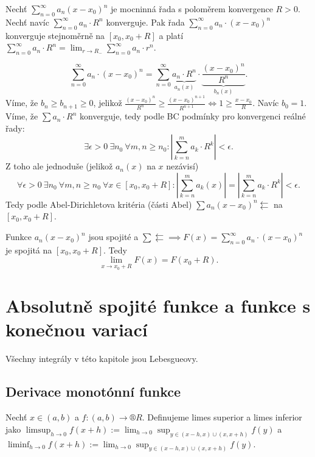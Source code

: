 \documentclass[12pt]{article}					%
\begin{document}
	\begin{veta}[Abelova]
		Nechť $\sum_{n=0}^∞ a_n (x - x_0)^n$ je mocninná řada s poloměrem konvergence $R > 0$. Nechť navíc $\sum_{n=0}^∞ a_n · R^n$ konverguje. Pak řada $\sum_{n=0}^∞ a_n·(x - x_0)^n$ konverguje stejnoměrně na $[x_0, x_0 + R]$ a platí $\sum_{n=0}^∞ a_n·R^n = \lim_{r \rightarrow R_-} \sum_{n=0}^∞ a_n · r^n$.

		\begin{dukazin}
			$$ \sum_{n=0}^∞ a_n · (x - x_0)^n = \sum_{n=0}^∞ \underbrace{a_n·R^n}_{a_n(x)}·\underbrace{\frac{(x - x_0)^n}{R^n}}_{b_n(x)}. $$
			Víme, že $b_n ≥ b_{n+1} ≥ 0$, jelikož $\frac{(x - x_0)^n}{R^n} ≥ \frac{(x - x_0)^{n+1}}{R^{n+1}} \Leftrightarrow 1 ≥ \frac{x - x_0}{R}$. Navíc $b_0 = 1$. Víme, že $\sum a_n·R^n$ konverguje, tedy podle BC podmínky pro konvergenci reálné řady:
			$$ \exists \epsilon > 0\ \exists n_0\ \forall m, n ≥ n_0: |\sum_{k=n}^m a_k·R^k| < \epsilon. $$
			Z toho ale jednoduše (jelikož $a_n(x)$ na $x$ nezávisí)
			$$ \forall \epsilon > 0\ \exists n_0\ \forall m, n ≥ n_0\ \forall x \in [x_0, x_0 + R]: |\sum_{k=n}^m a_k(x)| = |\sum_{k=n}^m a_k·R^k| < \epsilon. $$
			Tedy podle Abel-Dirichletova kritéria (části Abel) $\sum a_n(x - x_0)^n \leftleftarrows$ na $[x_0, x_0 + R]$.

			Funkce $a_n (x - x_0)^n$ jsou spojité a $\sum \leftleftarrows \implies F(x) = \sum_{n=0}^∞ a_n·(x - x_0)^n$ je spojitá na $[x_0, x_0 + R]$. Tedy
			$$ \lim_{x \rightarrow x_0 + R} F(x) = F(x_0 + R). $$
		\end{dukazin}
	\end{veta}

\section{Absolutně spojité funkce a funkce s konečnou variací}
	\begin{poznamka}
		Všechny integrály v této kapitole jsou Lebesgueovy.
	\end{poznamka}

	\subsection{Derivace monotónní funkce}
	\begin{definice}
		Nechť $x \in (a, b)$ a $f: (a, b) \rightarrow ®R$. Definujeme limes superior a limes inferior jako $\limsup_{h \rightarrow 0} f(x + h) := \lim_{h \rightarrow 0} \sup_{y \in (x - h, x) \cup (x, x + h)} f(y)$ a $\liminf_{h \rightarrow 0} f(x + h) := \lim_{h \rightarrow 0} \sup_{y \in (x - h, x) \cup (x, x + h)} f(y)$.
	\end{definice}
\end{document}
